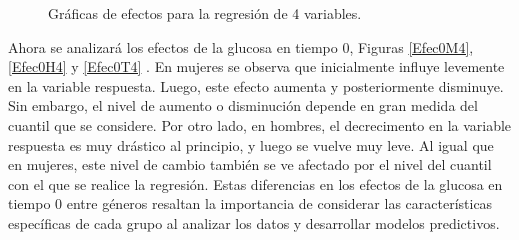 \begin{figure}[H]
 \centering
    \caption{Gráficas de efectos para la regresión de 4 variables.}
    \label{fig:efecto4}
\end{figure}



Ahora se analizará los efectos de la glucosa en tiempo $0$, Figuras \ref{Efec0M4}, \ref{Efec0H4} y \ref{Efec0T4} . En mujeres se observa que inicialmente influye levemente en la variable respuesta. Luego, este efecto aumenta y posteriormente disminuye. Sin embargo, el nivel de aumento o disminución depende en gran medida del cuantil que se considere. Por otro lado, en hombres, el decrecimento en la variable respuesta es muy drástico al principio, y luego se vuelve muy leve. Al igual que en mujeres, este nivel de cambio también se ve afectado por el nivel del cuantil con el que se realice la regresión. Estas diferencias en los efectos de la glucosa en tiempo $0$ entre géneros resaltan la importancia de considerar las características específicas de cada grupo al analizar los datos y desarrollar modelos predictivos.



